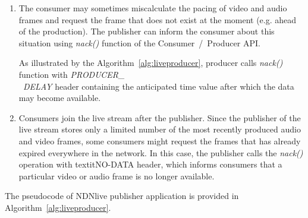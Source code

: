 \begin{enumerate}
	\item The consumer may sometimes miscalculate the pacing of video and audio frames and request the frame that does not exist at the moment (e.g. ahead of the production). The publisher can inform the consumer about this situation using \textit{nack()} function of the Consumer~/~Producer API. 

	As illustrated by the Algorithm~\ref{alg:liveproducer}, producer calls \textit{nack()} function with \textit{PRODUCER\_ \\\ DELAY} header containing the anticipated time value after which the data may become available.
	
	\item Consumers join the live stream after the publisher. Since the publisher of the live stream stores only a limited number of the most recently produced audio and video frames, some consumers might request the frames that has already expired everywhere in the network. In this case, the publisher calls the \textit{nack()} operation with textit{NO-DATA} header, which informs consumers that a particular video or audio frame is no longer available.
	
\end{enumerate}

The pseudocode of NDNlive publisher application is provided in Algorithm~\ref{alg:liveproducer}.

